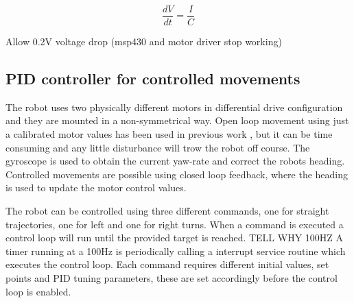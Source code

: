 \begin{equation}
\frac{dV}{dt} = \frac{I}{C}
\end{equation}

Allow 0.2V voltage drop (msp430 and motor driver stop working)


 


\subsection{PID controller for controlled movements}




The robot uses two physically different motors in differential drive configuration and they are mounted in a non-symmetrical way.
Open loop movement using just a calibrated motor values has been used in previous work \cite{legoc_uist_2016}, but it can be time consuming and any little disturbance will trow the robot off course.
The gyroscope is used to obtain the current yaw-rate and correct the robots heading.
Controlled movements are possible using closed loop feedback, where the heading is used to update the motor control values.

The robot can be controlled using three different commands, one for straight trajectories, one for left and one for right turns.
When a command is executed a control loop will run until the provided target is reached.
TELL WHY 100HZ
A timer running at a 100Hz is periodically calling a interrupt service routine which executes the control loop.   
Each command requires different initial values, set points and PID tuning parameters, these are set accordingly before the control loop is enabled.

